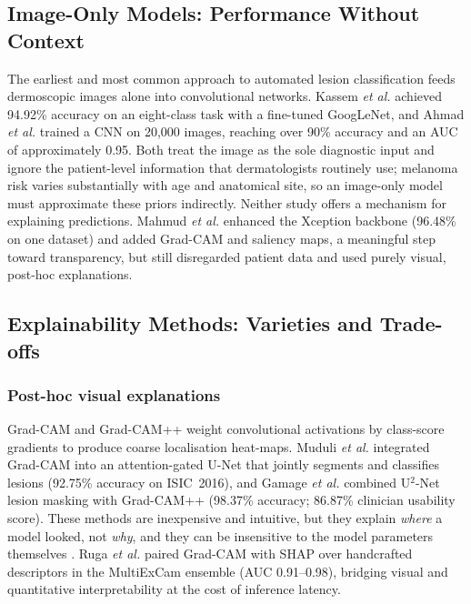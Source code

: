 \documentclass[journal]{IEEEtran}
\begin{document}
\subsection{Image-Only Models: Performance Without Context}
The earliest and most common approach to automated lesion classification feeds dermoscopic images alone into convolutional networks. Kassem \textit{et al.} \cite{kassem2020} achieved 94.92\% accuracy on an eight-class task with a fine-tuned GoogLeNet, and Ahmad \textit{et al.} \cite{ahmad2023} trained a CNN on 20,000 images, reaching over 90\% accuracy and an AUC of approximately 0.95. Both treat the image as the sole diagnostic input and ignore the patient-level information that dermatologists routinely use; melanoma risk varies substantially with age and anatomical site, so an image-only model must approximate these priors indirectly. Neither study offers a mechanism for explaining predictions. Mahmud \textit{et al.} \cite{mahmud2025} enhanced the Xception backbone (96.48\% on one dataset) and added Grad-CAM and saliency maps, a meaningful step toward transparency, but still disregarded patient data and used purely visual, post-hoc explanations.

\subsection{Explainability Methods: Varieties and Trade-offs}
\subsubsection{Post-hoc visual explanations}
Grad-CAM \cite{selvaraju2017} and Grad-CAM++ \cite{chattopadhay2018} weight convolutional activations by class-score gradients to produce coarse localisation heat-maps. Muduli \textit{et al.} \cite{muduli2025} integrated Grad-CAM into an attention-gated U-Net that jointly segments and classifies lesions (92.75\% accuracy on ISIC~2016), and Gamage \textit{et al.} \cite{gamage2024} combined U$^2$-Net lesion masking with Grad-CAM++ (98.37\% accuracy; 86.87\% clinician usability score). These methods are inexpensive and intuitive, but they explain \emph{where} a model looked, not \emph{why}, and they can be insensitive to the model parameters themselves \cite{adebayo2018}. Ruga \textit{et al.} \cite{ruga2026} paired Grad-CAM with SHAP \cite{lundberg2017} over handcrafted descriptors in the MultiExCam ensemble (AUC 0.91--0.98), bridging visual and quantitative interpretability at the cost of inference latency.
\end{document}
